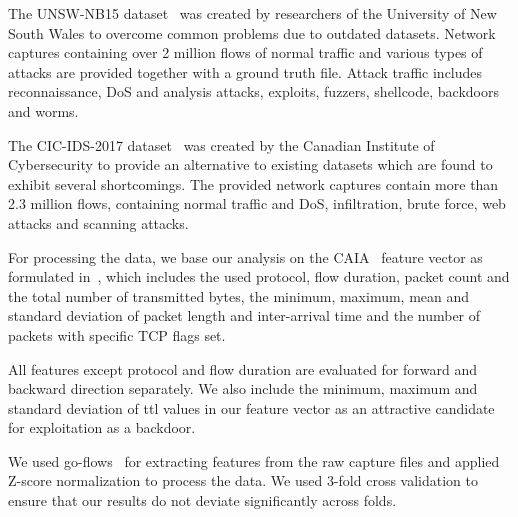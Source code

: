 \documentclass[9pt,sigconf,letterpaper,dvipsnames\ifx\removeHeaders\tempYes ,nonacm\fi]{acmart}
\newcommand{\unsw}{UNSW-NB15}
\newcommand{\cic}{CIC-IDS-2017}
\begin{document}
The \unsw{} dataset~\cite{moustafa_unsw-nb15:_2015} was created by researchers of the University of New South Wales to overcome common problems due to outdated datasets. Network captures containing over 2 million flows of normal traffic and various types of attacks are provided together with a ground truth file. Attack traffic includes reconnaissance, DoS and analysis attacks, exploits, fuzzers,  shellcode, backdoors and worms.

The \cic{} dataset~\cite{sharafaldin_toward_2018} was created by the Canadian Institute of Cybersecurity to provide an alternative to existing datasets which are found to exhibit several shortcomings. The provided network captures contain more than 2.3 million flows, containing normal traffic and DoS, infiltration,  brute force, web attacks and scanning attacks.

For processing the data, we base our analysis on the CAIA~\cite{williams_preliminary_2006} feature vector as formulated in~\cite{meghdouri_analysis_2018}, which includes the used protocol, flow duration, packet count and the total number of transmitted bytes, the minimum, maximum, mean and standard deviation of packet length and inter-arrival time and the number of packets with specific TCP flags set.

All features except protocol and flow duration are evaluated for forward and backward direction separately.
We also include the minimum, maximum and standard deviation of \gls{ttl} values in our feature vector as an attractive candidate for exploitation as a backdoor. %

We used go-flows~\cite{vormayr_go-flows_2019}
for extracting features from the raw capture files and applied Z-score normalization to process the data. We used 3-fold cross validation to ensure that our results do not deviate significantly across folds.
\end{document}
